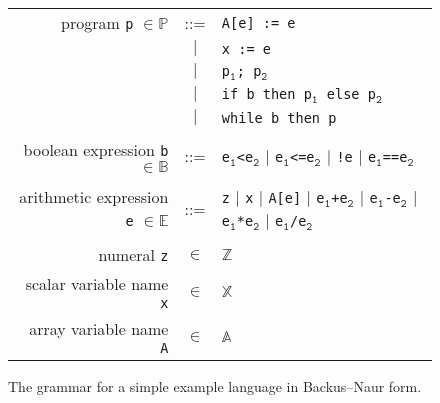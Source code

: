 \begin{figure}[!htb]
\begin{center}
\begin{tabular}{rcl}
	
program \texttt{p} $\in\mathbb{P}$& ::= & \texttt{A[e] := e}\\
  &$|$&  \texttt{x := e}\\
  &$|$&  \texttt{p$_\mathtt{1}$; p$_\mathtt{2}$}\\
  &$|$&  \texttt{if b then p$_\mathtt{1}$ else p$_\mathtt{2}$}\\
  &$|$&  \texttt{while b then p}\\
  \\
  boolean expression \texttt{b} $\in\mathbb{B}$ & ::= & \texttt{e$_\mathtt{1}$<e$_\mathtt{2}$} $|$  \texttt{e$_\mathtt{1}$<=e$_\mathtt{2}$} $|$ \texttt{!e} $|$ \texttt{e$_\mathtt{1}$==e$_\mathtt{2}$}\\
	\\
	arithmetic expression \texttt{e} $\in\mathbb{E}$ & ::= & \texttt{z} $|$ \texttt{x} $|$ \texttt{A[e]} $|$ \texttt{e$_\mathtt{1}$+e$_\mathtt{2}$} $|$ \texttt{e$_\mathtt{1}$-e$_\mathtt{2}$} $|$ \texttt{e$_\mathtt{1}$*e$_\mathtt{2}$} $|$ \texttt{e$_\mathtt{1}$/e$_\mathtt{2}$}\\

  \\
	numeral \texttt{z}&$\in$&$\mathbb{Z}$\\
	scalar variable name \texttt{x}&$\in$&$\mathbb{X}$\\
	array variable name \texttt{A}&$\in$&$\mathbb{A}$\\
\end{tabular}
\end{center}
\caption{The grammar for a simple example language in Backus--Naur form.}\label{fig:bnf_simplelanguage}
\end{figure}